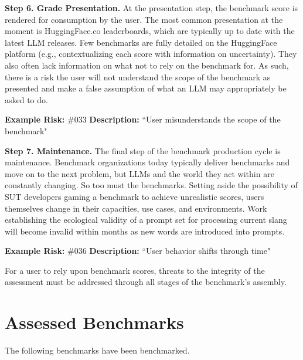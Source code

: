 \documentclass{article}
\begin{document}
{\bf Step 6. Grade Presentation.} At the presentation step, the benchmark score is rendered for consumption by the user. The most common presentation at the moment is HuggingFace.co leaderboards, which are typically up to date with the latest LLM releases. Few benchmarks are fully detailed on the HuggingFace platform (e.g., contextualizing each score with information on uncertainty). They also often lack information on what not to rely on the benchmark for. As such, there is a risk the user will not understand the scope of the benchmark as presented and make a false assumption of what an LLM may appropriately be asked to do.

\begin{center}
    \begin{tcolorbox}[colback=gray!10, colframe=black!50, width=\textwidth, boxrule=0.5mm, sharp corners, coltext=black]
        {\bf Example Risk:} \#033
        \newline
        {\bf Description:} ``User misunderstands the scope of the benchmark"
    \end{tcolorbox}
\end{center}

{\bf Step 7. Maintenance.} The final step of the benchmark production cycle is maintenance. Benchmark organizations today typically deliver benchmarks and move on to the next problem, but LLMs and the world they act within are constantly changing. So too must the benchmarks. Setting aside the possibility of SUT developers gaming a benchmark to achieve unrealistic scores, users themselves change in their capacities, use cases, and environments. Work establishing the ecological validity of a prompt set for processing current slang will become invalid within months as new words are introduced into prompts.

\begin{center}
    \begin{tcolorbox}[colback=gray!10, colframe=black!50, width=\textwidth, boxrule=0.5mm, sharp corners, coltext=black]
        {\bf Example Risk:} \#036
        \newline
        {\bf Description:} ``User behavior shifts through time"
    \end{tcolorbox}
\end{center}

For a user to rely upon benchmark scores, threats to the integrity of the assessment must be addressed through all stages of the benchmark's assembly.
\section{Assessed Benchmarks}
The following benchmarks have been benchmarked.
\end{document}
